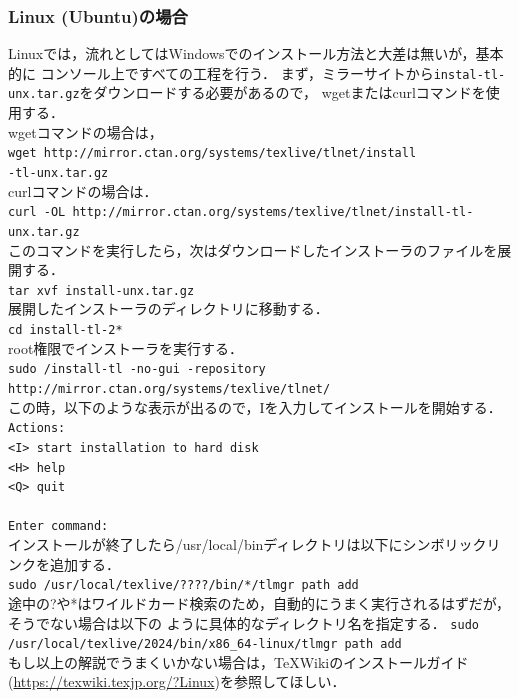 \subsubsection{Linux (Ubuntu)の場合}
Linuxでは，流れとしてはWindowsでのインストール方法と大差は無いが，基本的に
コンソール上ですべての工程を行う．
まず，ミラーサイトから\texttt{instal-tl-unx.tar.gz}をダウンロードする必要があるので，
wgetまたはcurlコマンドを使用する．\\
wgetコマンドの場合は，\\
\texttt{wget http://mirror.ctan.org/systems/texlive/tlnet/install\\-tl-unx.tar.gz}\\
curlコマンドの場合は．\\
\texttt{curl -OL http://mirror.ctan.org/systems/texlive/tlnet/install-tl-unx.tar.gz}\\
このコマンドを実行したら，次はダウンロードしたインストーラのファイルを展開する．\\
\texttt{tar xvf install-unx.tar.gz}\\
展開したインストーラのディレクトリに移動する．\\
\texttt{cd install-tl-2*}\\
root権限でインストーラを実行する．\\
\texttt{sudo /install-tl -no-gui -repository \\
  http://mirror.ctan.org/systems/texlive/tlnet/}\\
この時，以下のような表示が出るので，Iを入力してインストールを開始する．
\texttt{
  Actions: \\
  <I> start  installation to hard disk\\
  <H> help\\
  <Q> quit\\
  \\
  Enter command:
}\\
インストールが終了したら/usr/local/binディレクトリは以下にシンボリックリンクを追加する．\\
\texttt{sudo /usr/local/texlive/????/bin/*/tlmgr path add}\\
途中の?や*はワイルドカード検索のため，自動的にうまく実行されるはずだが，そうでない場合は以下の
ように具体的なディレクトリ名を指定する．
\texttt{sudo /usr/local/texlive/2024/bin/x86\_64-linux/tlmgr path add}\\
もし以上の解説でうまくいかない場合は，TeXWikiのインストールガイド(\url{https://texwiki.texjp.org/?Linux})を参照してほしい．
\newpage
